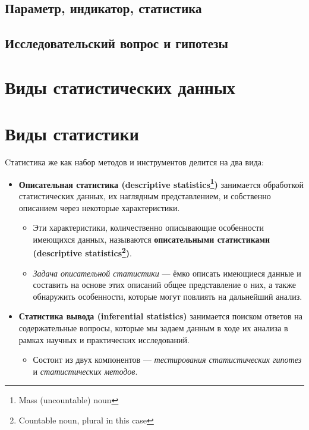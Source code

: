 \documentclass[
  letterpaper,
]{scrbook}
\providecommand{\tightlist}{%
  \setlength{\itemsep}{0pt}\setlength{\parskip}{0pt}}\usepackage{longtable,booktabs,array}
\theoremstyle{definition}
\theoremstyle{remark}
\begin{document}
\subsection{Параметр, индикатор, статистика}\label{stats-parameters}

\subsection{Исследовательский вопрос и гипотезы}\label{stats-hypotheses}

\section{Виды статистических данных}\label{stats-data}

\section{Виды статистики}\label{stats-kinds}

Cтатистика же как набор методов и инструментов делится на два вида:

\begin{itemize}
\tightlist
\item
  \textbf{Описательная статистика (descriptive statistics\footnote{Mass
    (uncountable) noun})} занимается обработкой статистических данных,
  их наглядным представлением, и собственно описанием через некоторые
  характеристики.

  \begin{itemize}
  \tightlist
  \item
    Эти характеристики, количественно описывающие особенности имеющихся
    данных, называются \textbf{описательными статистиками (descriptive
    statistics\footnote{Countable noun, plural in this case})}.
  \item
    \emph{Задача описательной статистики} --- ёмко описать имеющиеся
    данные и составить на основе этих описаний общее представление о
    них, а также обнаружить особенности, которые могут повлиять на
    дальнейший анализ.
  \end{itemize}
\item
  \textbf{Статистика вывода (inferential statistics)} занимается поиском
  ответов на содержательные вопросы, которые мы задаем данным в ходе их
  анализа в рамках научных и практических исследований.

  \begin{itemize}
  \tightlist
  \item
    Состоит из двух компонентов --- \emph{тестирования статистических
    гипотез} и \emph{статистических методов}.
  \end{itemize}
\end{itemize}
\end{document}
